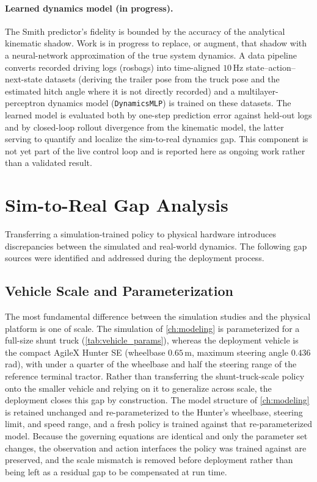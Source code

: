 \paragraph{Learned dynamics model (in progress).} The Smith predictor's fidelity is bounded by the accuracy of the analytical kinematic shadow. Work is in progress to replace, or augment, that shadow with a neural-network approximation of the true system dynamics. A data pipeline converts recorded driving logs (rosbags) into time-aligned $10$\,Hz state--action--next-state datasets (deriving the trailer pose from the truck pose and the estimated hitch angle where it is not directly recorded) and a multilayer-perceptron dynamics model (\texttt{DynamicsMLP}) is trained on these datasets. The learned model is evaluated both by one-step prediction error against held-out logs and by closed-loop rollout divergence from the kinematic model, the latter serving to quantify and localize the sim-to-real dynamics gap. This component is not yet part of the live control loop and is reported here as ongoing work rather than a validated result.

\section{Sim-to-Real Gap Analysis}

Transferring a simulation-trained policy to physical hardware introduces discrepancies between the simulated and real-world dynamics. The following gap sources were identified and addressed during the deployment process.

\subsection{Vehicle Scale and Parameterization}
\label{sec:gap_scale}

The most fundamental difference between the simulation studies and the physical platform is one of scale. The simulation of \cref{ch:modeling} is parameterized for a full-size shunt truck (\cref{tab:vehicle_params}), whereas the deployment vehicle is the compact AgileX Hunter SE (wheelbase $0.65$\,m, maximum steering angle $0.436$\,rad), with under a quarter of the wheelbase and half the steering range of the reference terminal tractor. Rather than transferring the shunt-truck-scale policy onto the smaller vehicle and relying on it to generalize across scale, the deployment closes this gap by construction. The model structure of \cref{ch:modeling} is retained unchanged and re-parameterized to the Hunter's wheelbase, steering limit, and speed range, and a fresh policy is trained against that re-parameterized model. Because the governing equations are identical and only the parameter set changes, the observation and action interfaces the policy was trained against are preserved, and the scale mismatch is removed before deployment rather than being left as a residual gap to be compensated at run time.


